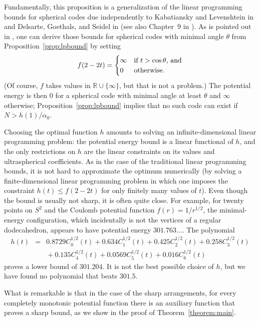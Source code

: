 \documentclass{jams-l}
\theoremstyle{plain}
\numberwithin{theorem}{section}
\theoremstyle{definition}
\numberwithin{equation}{section}
\newcommand{\R}{{\mathbb R}}
\begin{document}
Fundamentally, this proposition is a generalization of the linear
programming bounds for spherical codes due independently to
Kabatiansky and Levenshtein in \cite{KL} and Delsarte, Goethals,
and Seidel in \cite{DGS} (see also Chapter~9 in \cite{CS}).  As is
pointed out in \cite{Y}, one can derive those bounds for spherical
codes with minimal angle $\theta$ from
Proposition~\ref{prop:lpbound} by setting
$$
f(2-2t) = \begin{cases} \infty & \textup{if $t>\cos \theta$, and}\\
0 & \textup{otherwise.}
\end{cases}
$$
(Of course, $f$ takes values in $\R \cup \{\infty\}$, but that is
not a problem.)  The potential energy is then $0$ for a spherical
code with minimal angle at least $\theta$ and $\infty$ otherwise;
Proposition~\ref{prop:lpbound} implies that no such code can exist
if $N > h(1)/\alpha_0$.

Choosing the optimal function $h$ amounts to solving an
infinite-dimensional linear programming problem: the potential
energy bound is a linear functional of $h$, and the only
restrictions on $h$ are the linear constraints on its values and
ultraspherical coefficients. As in the case of the traditional
linear programming bounds, it is not hard to approximate the
optimum numerically (by solving a finite-dimensional linear
programming problem in which one imposes the constraint $h(t) \le
f(2-2t)$ for only finitely many values of $t$).  Even though the
bound is usually not sharp, it is often quite close.  For example,
for twenty points on $S^2$ and the Coulomb potential function
$f(r)=1/r^{1/2}$, the minimal-energy configuration, which
incidentally is not the vertices of a regular dodecahedron,
appears to have potential energy $301.763\dots$. The polynomial
\begin{eqnarray*}
h(t) &= & 0.8729 C^{1/2}_0(t) + 0.634 C^{1/2}_1(t) + 0.425
C^{1/2}_2(t) + 0.258 C^{1/2}_3(t)\\
&& \phantom{} + 0.135 C^{1/2}_4(t) + 0.0569 C^{1/2}_5(t) + 0.016
C^{1/2}_6(t)
\end{eqnarray*}
proves a lower bound of $301.204$.  It is not the best possible
choice of $h$, but we have found no polynomial that beats $301.5$.

What is remarkable is that in the case of the sharp arrangements,
for every completely monotonic potential function there is an
auxiliary function that proves a sharp bound, as we show in the
proof of Theorem~\ref{theorem:main}.
\end{document}
